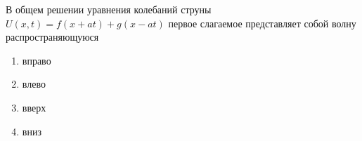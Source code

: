 В общем решении уравнения колебаний струны \(U\left(x,t\right)=f\left(x+at\right)+g(x-at)\) первое слагаемое представляет собой волну распространяющуюся

\begin{enumerate}[label=\arabic*)]
    \item вправо
    \item влево
    \item вверх
    \item вниз
\end{enumerate}

